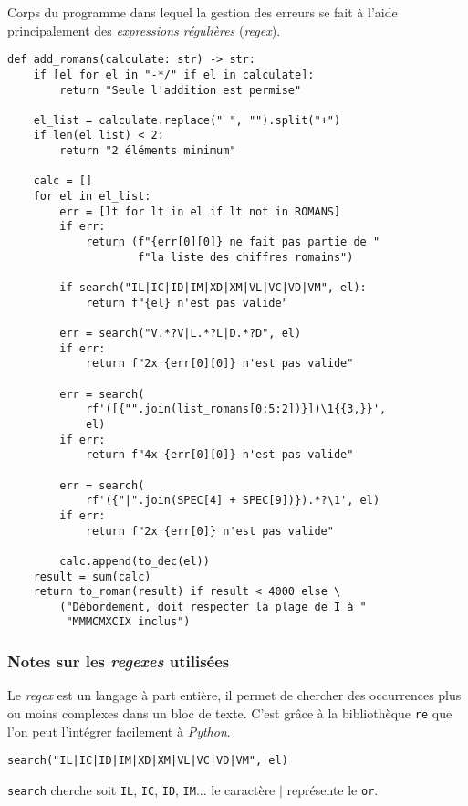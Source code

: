 Corps du programme dans lequel la gestion des erreurs se fait à l'aide principalement des \textit{expressions régulières} (\textit{regex}).
\begin{lstlisting}
def add_romans(calculate: str) -> str:
    if [el for el in "-*/" if el in calculate]:
        return "Seule l'addition est permise"

    el_list = calculate.replace(" ", "").split("+")
    if len(el_list) < 2:
        return "2 éléments minimum"

    calc = []
    for el in el_list:
        err = [lt for lt in el if lt not in ROMANS]
        if err:
            return (f"{err[0][0]} ne fait pas partie de "
                    f"la liste des chiffres romains")

        if search("IL|IC|ID|IM|XD|XM|VL|VC|VD|VM", el):
            return f"{el} n'est pas valide"

        err = search("V.*?V|L.*?L|D.*?D", el)
        if err:
            return f"2x {err[0][0]} n'est pas valide"

        err = search(
            rf'([{"".join(list_romans[0:5:2])}])\1{{3,}}',
            el)
        if err:
            return f"4x {err[0][0]} n'est pas valide"

        err = search(
            rf'({"|".join(SPEC[4] + SPEC[9])}).*?\1', el)
        if err:
            return f"2x {err[0]} n'est pas valide"

        calc.append(to_dec(el))
    result = sum(calc)
    return to_roman(result) if result < 4000 else \
        ("Débordement, doit respecter la plage de I à "
         "MMMCMXCIX inclus")
\end{lstlisting}
\medskip

\subsubsection*{Notes sur les \textit{regexes} utilisées}
Le \textit{regex} est un langage à part entière, il permet de chercher des occurrences plus ou moins complexes dans un bloc de texte. C'est grâce à la bibliothèque \texttt{re} que l'on peut l'intégrer facilement à \textit{Python}.
\begin{verbatim}
search("IL|IC|ID|IM|XD|XM|VL|VC|VD|VM", el)
\end{verbatim}

\texttt{search} cherche soit \texttt{IL}, \texttt{IC}, \texttt{ID}, \texttt{IM}... le caractère \og \texttt{$|$}\fg{} représente le \og \texttt{or}\fg{}.
\medskip

